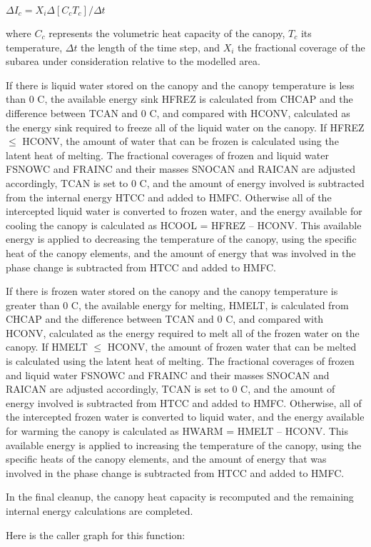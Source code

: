 $\Delta I_c = X_i \Delta [C_c T_c ] / \Delta t$

where $C_c$ represents the volumetric heat capacity of the canopy, $T_c$ its temperature, $\Delta t$ the length of the time step, and $X_i$ the fractional coverage of the subarea under consideration relative to the modelled area.

If there is liquid water stored on the canopy and the canopy temperature is less than 0 C, the available energy sink H\+F\+R\+E\+Z is calculated from C\+H\+C\+A\+P and the difference between T\+C\+A\+N and 0 C, and compared with H\+C\+O\+N\+V, calculated as the energy sink required to freeze all of the liquid water on the canopy. If H\+F\+R\+E\+Z $\leq$ H\+C\+O\+N\+V, the amount of water that can be frozen is calculated using the latent heat of melting. The fractional coverages of frozen and liquid water F\+S\+N\+O\+W\+C and F\+R\+A\+I\+N\+C and their masses S\+N\+O\+C\+A\+N and R\+A\+I\+C\+A\+N are adjusted accordingly, T\+C\+A\+N is set to 0 C, and the amount of energy involved is subtracted from the internal energy H\+T\+C\+C and added to H\+M\+F\+C. Otherwise all of the intercepted liquid water is converted to frozen water, and the energy available for cooling the canopy is calculated as H\+C\+O\+O\+L = H\+F\+R\+E\+Z – H\+C\+O\+N\+V. This available energy is applied to decreasing the temperature of the canopy, using the specific heat of the canopy elements, and the amount of energy that was involved in the phase change is subtracted from H\+T\+C\+C and added to H\+M\+F\+C.

If there is frozen water stored on the canopy and the canopy temperature is greater than 0 C, the available energy for melting, H\+M\+E\+L\+T, is calculated from C\+H\+C\+A\+P and the difference between T\+C\+A\+N and 0 C, and compared with H\+C\+O\+N\+V, calculated as the energy required to melt all of the frozen water on the canopy. If H\+M\+E\+L\+T $\leq$ H\+C\+O\+N\+V, the amount of frozen water that can be melted is calculated using the latent heat of melting. The fractional coverages of frozen and liquid water F\+S\+N\+O\+W\+C and F\+R\+A\+I\+N\+C and their masses S\+N\+O\+C\+A\+N and R\+A\+I\+C\+A\+N are adjusted accordingly, T\+C\+A\+N is set to 0 C, and the amount of energy involved is subtracted from H\+T\+C\+C and added to H\+M\+F\+C. Otherwise, all of the intercepted frozen water is converted to liquid water, and the energy available for warming the canopy is calculated as H\+W\+A\+R\+M = H\+M\+E\+L\+T – H\+C\+O\+N\+V. This available energy is applied to increasing the temperature of the canopy, using the specific heats of the canopy elements, and the amount of energy that was involved in the phase change is subtracted from H\+T\+C\+C and added to H\+M\+F\+C.

In the final cleanup, the canopy heat capacity is recomputed and the remaining internal energy calculations are completed.

Here is the caller graph for this function\+:


